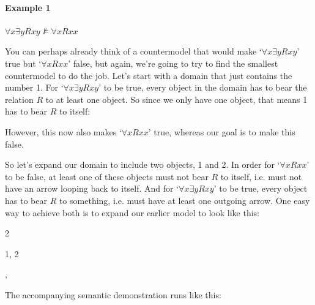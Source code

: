 \paragraph{Example 1} $\forall x \exists y Rxy \nvDash \forall xRxx$

You can perhaps already think of a countermodel that would make `$\forall x \exists y Rxy$' true but `$ \forall xRxx$' false, but again, we're going to try to find the smallest countermodel to do the job.  Let's start with a domain that just contains the number 1.  For `$\forall x \exists y Rxy$' to be true, every object in the domain has to bear the relation $R$ to at least one object.  So since we only have one object, that means 1 has to bear $R$ to itself:
\begin{center}
\end{center}
However, this now also makes `$\forall xRxx$' true, whereas our goal is to make this false.

So let's expand our domain to include two objects, 1 and 2.  In order for `$\forall xRxx$' to be false, at least one of these objects must not bear $R$ to itself, i.e. must not have an arrow looping back to itself.  And for `$\forall x\exists yRxy$' to be true, every object has to bear $R$ to something, i.e. must have at least one outgoing arrow.  One easy way to achieve both is to expand our earlier model to look like this:

\begin{center}
\begin{minipage}{0.8\textwidth}
\begin{multicols}{2}
\begin{ekey}
	\item[\text{Domain}] 1, 2
	\item[R] , 
\end{ekey}
\columnbreak
{}
\end{multicols}\end{minipage}\end{center}
The accompanying semantic demonstration runs like this:

